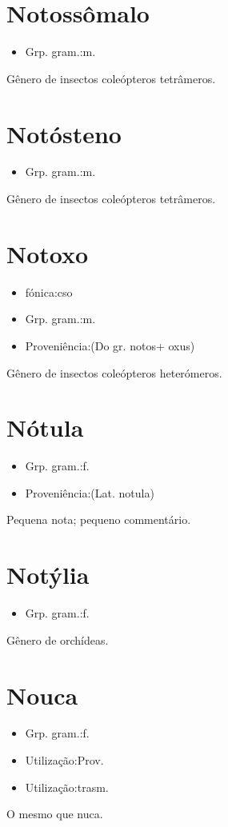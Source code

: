 \section{Notossômalo}
\begin{itemize}
\item {Grp. gram.:m.}
\end{itemize}
Gênero de insectos coleópteros tetrâmeros.
\section{Notósteno}
\begin{itemize}
\item {Grp. gram.:m.}
\end{itemize}
Gênero de insectos coleópteros tetrâmeros.
\section{Notoxo}
\begin{itemize}
\item {fónica:cso}
\end{itemize}
\begin{itemize}
\item {Grp. gram.:m.}
\end{itemize}
\begin{itemize}
\item {Proveniência:(Do gr. \textunderscore notos\textunderscore  + \textunderscore oxus\textunderscore )}
\end{itemize}
Gênero de insectos coleópteros heterómeros.
\section{Nótula}
\begin{itemize}
\item {Grp. gram.:f.}
\end{itemize}
\begin{itemize}
\item {Proveniência:(Lat. \textunderscore notula\textunderscore )}
\end{itemize}
Pequena nota; pequeno commentário.
\section{Notýlia}
\begin{itemize}
\item {Grp. gram.:f.}
\end{itemize}
Gênero de orchídeas.
\section{Nouca}
\begin{itemize}
\item {Grp. gram.:f.}
\end{itemize}
\begin{itemize}
\item {Utilização:Prov.}
\end{itemize}
\begin{itemize}
\item {Utilização:trasm.}
\end{itemize}
O mesmo que \textunderscore nuca\textunderscore .
